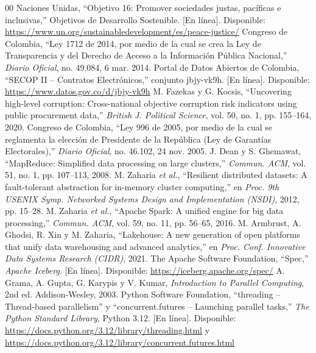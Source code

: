 \documentclass[conference]{IEEEtran}
\begin{document}
\balance
\begin{thebibliography}{00}
 Naciones Unidas, ``Objetivo 16: Promover sociedades justas, pacíficas e inclusivas,'' Objetivos de Desarrollo Sostenible. [En línea]. Disponible: \url{https://www.un.org/sustainabledevelopment/es/peace-justice/}
 Congreso de Colombia, ``Ley 1712 de 2014, por medio de la cual se crea la Ley de Transparencia y del Derecho de Acceso a la Información Pública Nacional,'' \textit{Diario Oficial}, no. 49.084, 6 mar. 2014.
 Portal de Datos Abiertos de Colombia, ``SECOP II -- Contratos Electrónicos,'' conjunto jbjy-vk9h. [En línea]. Disponible: \url{https://www.datos.gov.co/d/jbjy-vk9h}
 M. Fazekas y G. Kocsis, ``Uncovering high-level corruption: Cross-national objective corruption risk indicators using public procurement data,'' \textit{British J. Political Science}, vol. 50, no. 1, pp. 155--164, 2020.
 Congreso de Colombia, ``Ley 996 de 2005, por medio de la cual se reglamenta la elección de Presidente de la República (Ley de Garantías Electorales),'' \textit{Diario Oficial}, no. 46.102, 24 nov. 2005.
 J. Dean y S. Ghemawat, ``MapReduce: Simplified data processing on large clusters,'' \textit{Commun. ACM}, vol. 51, no. 1, pp. 107--113, 2008.
 M. Zaharia \textit{et al.}, ``Resilient distributed datasets: A fault-tolerant abstraction for in-memory cluster computing,'' en \textit{Proc. 9th USENIX Symp. Networked Systems Design and Implementation (NSDI)}, 2012, pp. 15--28.
 M. Zaharia \textit{et al.}, ``Apache Spark: A unified engine for big data processing,'' \textit{Commun. ACM}, vol. 59, no. 11, pp. 56--65, 2016.
 M. Armbrust, A. Ghodsi, R. Xin y M. Zaharia, ``Lakehouse: A new generation of open platforms that unify data warehousing and advanced analytics,'' en \textit{Proc. Conf. Innovative Data Systems Research (CIDR)}, 2021.
 The Apache Software Foundation, ``Spec,'' \textit{Apache Iceberg}. [En línea]. Disponible: \url{https://iceberg.apache.org/spec/}
 A. Grama, A. Gupta, G. Karypis y V. Kumar, \textit{Introduction to Parallel Computing}, 2nd ed. Addison-Wesley, 2003.
 Python Software Foundation, ``threading -- Thread-based parallelism'' y ``concurrent.futures -- Launching parallel tasks,'' \textit{The Python Standard Library}, Python 3.12. [En línea]. Disponible: \url{https://docs.python.org/3.12/library/threading.html} y \url{https://docs.python.org/3.12/library/concurrent.futures.html}

\end{thebibliography}
\end{document}
